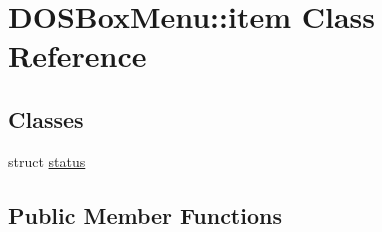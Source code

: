 \hypertarget{classDOSBoxMenu_1_1item}{\section{D\-O\-S\-Box\-Menu\-:\-:item Class Reference}
\label{classDOSBoxMenu_1_1item}
}
\subsection*{Classes}
\begin{DoxyCompactItemize}
\item 
struct \hyperlink{structDOSBoxMenu_1_1item_1_1status}{status}
\end{DoxyCompactItemize}
\subsection*{Public Member Functions}
